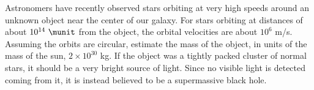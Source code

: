  Astronomers have recently observed stars orbiting at
very high speeds around an unknown object near the center of
our galaxy. For stars orbiting at distances of about
$10^{14}\ \munit$ from the object, the orbital velocities are about
$10^6$  m/s. Assuming the orbits are circular, estimate the
mass of the object, in units of the mass of the sun,
$2\times10^{30}$  kg. If the object was a tightly packed
cluster of normal stars, it should be a very bright source
of light. Since no visible light is detected coming from it,
it is instead believed to be a supermassive black hole.\answercheck
